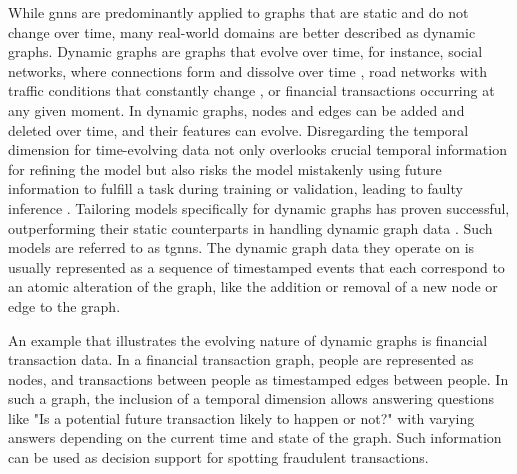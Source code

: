 While \glspl{gnn} are predominantly applied to graphs that are static and do not change over time, many real-world domains are better described as dynamic graphs. Dynamic graphs are graphs that evolve over time, for instance, social networks, where connections form and dissolve over time \cite{rossi_temporal_2020, souza_provably_2022}, road networks with traffic conditions that constantly change \cite{zhao_t-gcn_2020}, or financial transactions occurring at any given moment. In dynamic graphs, nodes and edges can be added and deleted over time, and their features can evolve. Disregarding the temporal dimension for time-evolving data not only overlooks crucial temporal information for refining the model \cite{xu_inductive_2020} but also risks the model mistakenly using future information to fulfill a task during training or validation, leading to faulty inference \cite{xu_inductive_2020}. Tailoring models specifically for dynamic graphs has proven successful, outperforming their static counterparts in handling dynamic graph data \cite{ma_streaming_2018, makarov_temporal_2021, rossi_temporal_2020, trivedi_dyrep_2019, xu_inductive_2020, souza_provably_2022}. Such models are referred to as \glspl{tgnn}. The dynamic graph data they operate on is usually represented as a sequence of timestamped events that each correspond to an atomic alteration of the graph, like the addition or removal of a new node or edge to the graph.

An example that illustrates the evolving nature of dynamic graphs is financial transaction data. In a financial transaction graph, people are represented as nodes, and transactions between people as timestamped edges between people. In such a graph, the inclusion of a temporal dimension allows answering questions like "Is a potential future transaction likely to happen or not?" with varying answers depending on the current time and state of the graph. Such information can be used as decision support for spotting fraudulent transactions.


